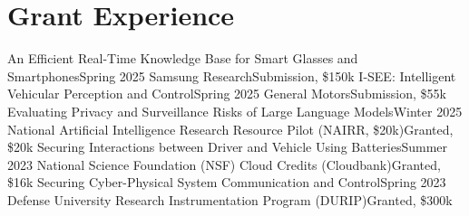 \section{Grant Experience}
  \CVSubHeadingListStart
    \CVSubheading
      {An Efficient Real-Time Knowledge Base for Smart Glasses and Smartphones}{Spring 2025}
      {Samsung Research}{Submission, \$150k}
    \CVSubheading
      {I-SEE: Intelligent Vehicular Perception and Control}{Spring 2025}
      {General Motors}{Submission, \$55k}
    \CVSubheading
      {Evaluating Privacy and Surveillance Risks of Large Language Models}{Winter 2025}
      {National Artificial Intelligence Research Resource Pilot (NAIRR, \$20k)}{Granted, \$20k}
    \CVSubheading
      {Securing Interactions between Driver and Vehicle Using Batteries}{Summer 2023}
      {National Science Foundation (NSF) Cloud Credits (Cloudbank)}{Granted, \$16k}
    \CVSubheading
      {Securing Cyber-Physical System Communication and Control}{Spring 2023}
      {Defense University Research Instrumentation Program (DURIP)}{Granted, \$300k}
  \CVSubHeadingListEnd